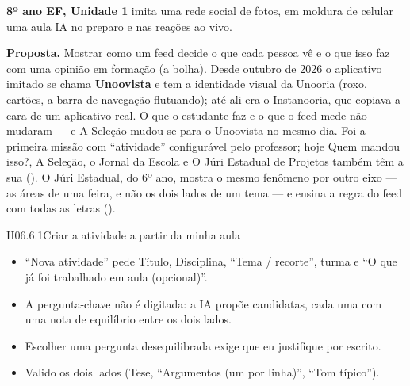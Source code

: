 
\textbf{8º ano EF, Unidade 1} \textperiodcentered{} imita uma rede social de
fotos, em moldura de celular \textperiodcentered{} uma aula
\textperiodcentered{} IA no preparo e nas reações ao vivo.

\textbf{Proposta.} Mostrar como um feed decide o que cada pessoa vê e o que
isso faz com uma opinião em formação (a bolha). Desde outubro de 2026 o
aplicativo imitado se chama \textbf{Unoovista} e tem a identidade visual da
Unooria (roxo, cartões, a barra de navegação flutuando); até ali era o
Instanooria, que copiava a cara de um aplicativo real. O que o estudante faz
e o que o feed mede não mudaram --- e A Seleção mudou-se para o Unoovista no
mesmo dia. Foi a primeira missão com
\enquote{atividade} configurável pelo professor; hoje Quem mandou isso?, A
Seleção, o Jornal da Escola e O Júri Estadual de Projetos também têm a sua
(). O Júri Estadual, do 6º ano, mostra o mesmo fenômeno por outro eixo
--- as áreas de uma feira, e não os dois lados de um tema --- e ensina a regra
do feed com todas as letras ().

\begin{historia}{H06.6.1}{Criar a atividade a partir da minha aula}{\pronto}
\aceite
\begin{itemize}
  \item \enquote{Nova atividade} pede Título, Disciplina, \enquote{Tema /
    recorte}, turma e \enquote{O que já foi trabalhado em aula (opcional)}.
  \item A pergunta-chave não é digitada: a IA propõe candidatas, cada uma com
    uma nota de equilíbrio entre os dois lados.
  \item Escolher uma pergunta desequilibrada exige que eu justifique por
    escrito.
  \item Valido os dois lados (Tese, \enquote{Argumentos (um por linha)},
    \enquote{Tom típico}).
\end{itemize}
\end{historia}

